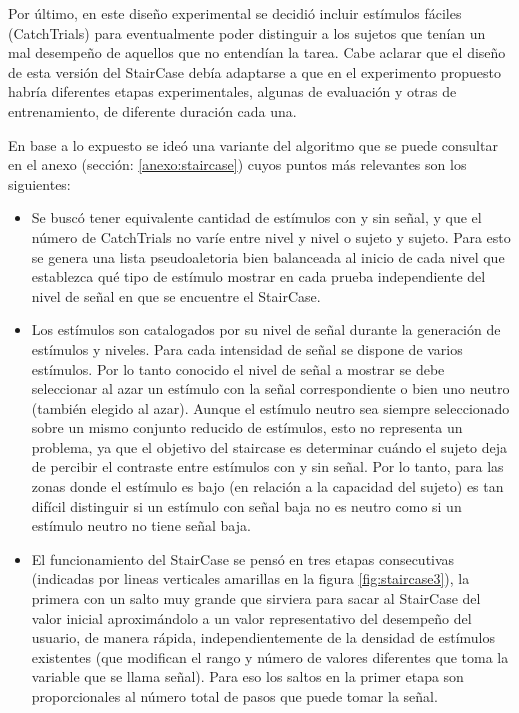 \documentclass{article}
\numberwithin{figure}{section}
\begin{document}
    Por último, en este diseño experimental se decidió incluir estímulos fáciles (CatchTrials) para eventualmente poder distinguir a los sujetos que tenían un mal desempeño de aquellos que no entendían la tarea. Cabe aclarar que el diseño de esta versión del StairCase debía adaptarse a que en el experimento propuesto habría diferentes etapas experimentales, algunas de evaluación y otras de entrenamiento, de diferente duración cada una.
    
    En base a lo expuesto se ideó una variante del algoritmo que se puede consultar en el anexo (sección:  \ref{anexo:staircase}) cuyos puntos más relevantes son los siguientes:
    
    \begin{itemize}
        \item Se buscó tener equivalente cantidad de estímulos con y sin señal, y que el número de CatchTrials no varíe entre nivel y nivel o sujeto y sujeto. Para esto se genera una lista pseudoaletoria bien balanceada al inicio de cada nivel que establezca qué tipo de estímulo mostrar en cada prueba independiente del nivel de señal en que se encuentre el StairCase. 
        \item Los estímulos son catalogados por su nivel de señal durante la generación de estímulos y niveles. Para cada intensidad de señal se dispone de varios estímulos. Por lo tanto conocido el nivel de señal a mostrar se debe seleccionar al azar un estímulo con la señal correspondiente o bien uno neutro (también elegido al azar). Aunque el estímulo neutro sea siempre seleccionado sobre un mismo conjunto reducido de estímulos, esto no representa un problema, ya que el objetivo del staircase es determinar cuándo el sujeto deja de percibir el contraste entre estímulos con y sin señal. Por lo tanto, para las zonas donde el estímulo es bajo (en relación a la capacidad del sujeto) es tan difícil distinguir si un estímulo con señal baja no es neutro como si un estímulo neutro no tiene señal baja.
        \item El funcionamiento del StairCase se pensó en tres etapas consecutivas (indicadas por lineas verticales amarillas en la figura \ref{fig:staircase3}), la primera con un salto muy grande que sirviera para sacar al StairCase del valor inicial aproximándolo a un valor representativo del desempeño del usuario, de manera rápida, independientemente de la densidad de estímulos existentes (que modifican el rango y número de valores diferentes que toma la variable que se  llama señal). Para eso los saltos en la primer etapa son proporcionales al número total de pasos que puede tomar la señal. 

\end{itemize}
\end{document}

